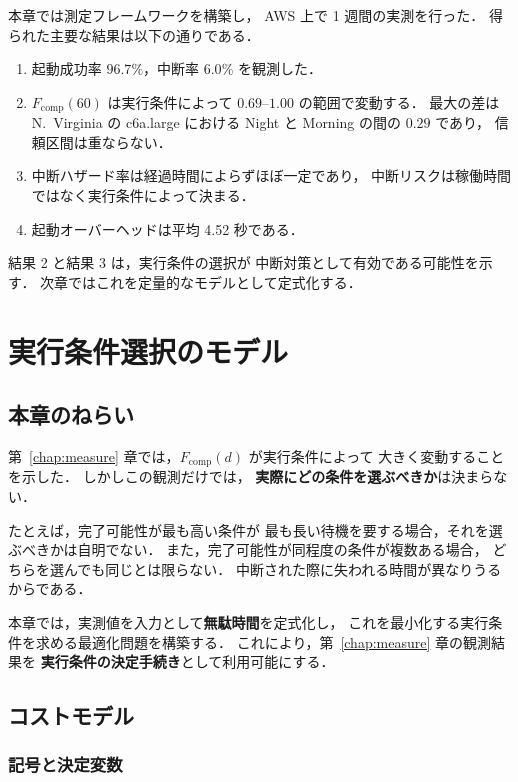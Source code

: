 \documentclass[11pt,a4paper]{ltjsreport}
\newcommand{\Fcomp}{F_{\mathrm{comp}}}
\begin{document}
本章では測定フレームワークを構築し，
AWS 上で 1 週間の実測を行った．
得られた主要な結果は以下の通りである．

\begin{enumerate}
  \item 起動成功率 $96.7\%$，中断率 $6.0\%$ を観測した．
  \item $\Fcomp(60)$ は実行条件によって $0.69$--$1.00$ の範囲で変動する．
        最大の差は N.~Virginia の c6a.large における
        Night と Morning の間の $0.29$ であり，
        信頼区間は重ならない．
  \item 中断ハザード率は経過時間によらずほぼ一定であり，
        中断リスクは稼働時間ではなく実行条件によって決まる．
  \item 起動オーバーヘッドは平均 4.52 秒である．
\end{enumerate}

結果 2 と結果 3 は，実行条件の選択が
中断対策として有効である可能性を示す．
次章ではこれを定量的なモデルとして定式化する．

\chapter{実行条件選択のモデル}
\label{chap:model}

\section{本章のねらい}

第~\ref{chap:measure} 章では，$\Fcomp(d)$ が実行条件によって
大きく変動することを示した．
しかしこの観測だけでは，
\textbf{実際にどの条件を選ぶべきか}は決まらない．

たとえば，完了可能性が最も高い条件が
最も長い待機を要する場合，それを選ぶべきかは自明でない．
また，完了可能性が同程度の条件が複数ある場合，
どちらを選んでも同じとは限らない．
中断された際に失われる時間が異なりうるからである．

本章では，実測値を入力として\textbf{無駄時間}を定式化し，
これを最小化する実行条件を求める最適化問題を構築する．
これにより，第~\ref{chap:measure} 章の観測結果を
\textbf{実行条件の決定手続き}として利用可能にする．

\section{コストモデル}
\label{sec:model_def}

\subsection{記号と決定変数}
\end{document}
